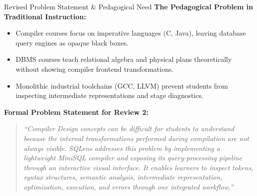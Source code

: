 \documentclass[aspectratio=169,10pt]{beamer}
\begin{document}
\begin{frame}{Revised Problem Statement \& Pedagogical Need}
    \textbf{The Pedagogical Problem in Traditional Instruction:}
    \begin{itemize}\small
        \item Compiler courses focus on imperative languages (C, Java), leaving database query engines as opaque black boxes.
        \item DBMS courses teach relational algebra and physical plans theoretically without showing compiler frontend transformations.
        \item Monolithic industrial toolchains (GCC, LLVM) prevent students from inspecting intermediate representations and stage diagnostics.
    \end{itemize}
    \vspace{0.8em}
    \textbf{Formal Problem Statement for Review 2:}
    \begin{quote}\small\itshape
        “Compiler Design concepts can be difficult for students to understand because the internal transformations performed during compilation are not always visible. SQLens addresses this problem by implementing a lightweight MiniSQL compiler and exposing its query-processing pipeline through an interactive visual interface. It enables learners to inspect tokens, syntax structures, semantic analysis, intermediate representation, optimization, execution, and errors through one integrated workflow.”
    \end{quote}
\end{frame}
\end{document}
